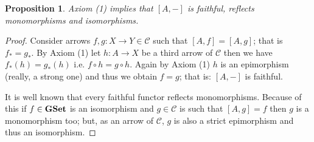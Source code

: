 \documentclass[italian, 12pt, reqno]{article}
\theoremstyle{myteo}
\newtheorem{proposition}[theorem]{Proposition}
\newtheorem{remark}[theorem]{Remark}
\numberwithin{equation}{section}
\newcommand{\cat}[1]{\mathscr{#1}}
\newcommand{\gset}{\text{\textbf{GSet}}}
\newcommand{\homs}[2]{[#1, #2]}
\newcommand{\fun}[3]{#1\colon#2\to #3}
\begin{document}
\begin{proposition}
  \label{prop:hom_is_faithful}
  Axiom (1) implies that \(\homs{A}{-}\) is faithful, reflects monomorphisms and isomorphisms.
\end{proposition}

\begin{proof}
  Consider arrows \(\fun{f,g}{X}{Y}\in\cat{C}\) such that \(\homs{A}{f} = \homs{A}{g}\); that is \(f_* = g_*\).
  By Axiom (1) let \(\fun{h}{A}{X}\) be a third arrow of \(\cat{C}\) then we have \(f_*(h) = g_*(h)\) i.e. \(f\circ h = g\circ h\).
  Again by Axiom (1) \(h\) is an epimorphism (really, a strong one) and thus we obtain \(f = g\); that is: \(\homs{A}{-}\) is faithful.
  
  It is well known that every faithful functor reflects monomorphisms.
  Because of this if \(f\in\gset\) is an isomorphism and \(g\in\cat{C}\) is such that \(\homs{A}{g} = f\) then \(g\) is a monomorphism too; but, as an arrow of \(\cat{C}\), \(g\) is also a strict epimorphism and thus an isomorphism.
\end{proof}

%

\end{document}
